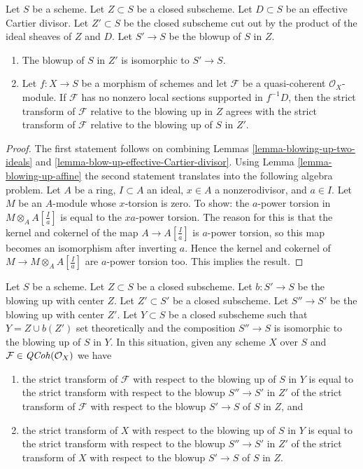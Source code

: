 \begin{lemma}
\label{lemma-strict-transform-different-centers}
Let $S$ be a scheme. Let $Z \subset S$ be a closed subscheme.
Let $D \subset S$ be an effective Cartier divisor.
Let $Z' \subset S$ be the closed subscheme cut out by the product
of the ideal sheaves of $Z$ and $D$.
Let $S' \to S$ be the blowup of $S$ in $Z$.
\begin{enumerate}
\item The blowup of $S$ in $Z'$ is isomorphic to $S' \to S$.
\item Let $f : X \to S$ be a morphism of schemes and let $\mathcal{F}$
be a quasi-coherent $\mathcal{O}_X$-module. If $\mathcal{F}$ has
no nonzero local sections supported in $f^{-1}D$, then the
strict transform of $\mathcal{F}$ relative to the blowing up
in $Z$ agrees with the strict transform of $\mathcal{F}$ relative
to the blowing up of $S$ in $Z'$.
\end{enumerate}
\end{lemma}

\begin{proof}
The first statement follows on combining
Lemmas \ref{lemma-blowing-up-two-ideals} and
\ref{lemma-blow-up-effective-Cartier-divisor}.
Using Lemma \ref{lemma-blowing-up-affine} the second statement
translates into the
following algebra problem. Let $A$ be a ring, $I \subset A$ an ideal,
$x \in A$ a nonzerodivisor, and $a \in I$. Let $M$ be an $A$-module
whose $x$-torsion is zero. To show: the $a$-power torsion in
$M \otimes_A A[\frac{I}{a}]$ is equal to the $xa$-power torsion.
The reason for this is that the kernel and cokernel of the map
$A \to A[\frac{I}{a}]$ is $a$-power torsion, so this map becomes an
isomorphism after inverting $a$. Hence the kernel
and cokernel of $M \to M \otimes_A A[\frac{I}{a}]$ are $a$-power
torsion too. This implies the result.
\end{proof}

\begin{lemma}
\label{lemma-strict-transform-composition-blowups}
Let $S$ be a scheme. Let $Z \subset S$ be a closed subscheme.
Let $b : S' \to S$ be the blowing up with center $Z$. Let $Z' \subset S'$ be
a closed subscheme. Let $S'' \to S'$ be the blowing up with center $Z'$.
Let $Y \subset S$ be a closed subscheme such that
$Y = Z \cup b(Z')$ set theoretically and the composition $S'' \to S$
is isomorphic to the blowing up of $S$ in $Y$.
In this situation, given any scheme $X$ over $S$ and
$\mathcal{F} \in \mathit{QCoh}(\mathcal{O}_X)$ we have
\begin{enumerate}
\item the strict transform of $\mathcal{F}$ with respect to the blowing
up of $S$ in $Y$ is equal to the strict transform with respect to the
blowup $S'' \to S'$ in $Z'$ of the strict transform of $\mathcal{F}$
with respect to the blowup $S' \to S$ of $S$ in $Z$, and
\item the strict transform of $X$ with respect to the blowing
up of $S$ in $Y$ is equal to the strict transform with respect to the
blowup $S'' \to S'$ in $Z'$ of the strict transform of $X$
with respect to the blowup $S' \to S$ of $S$ in $Z$.
\end{enumerate}
\end{lemma}

